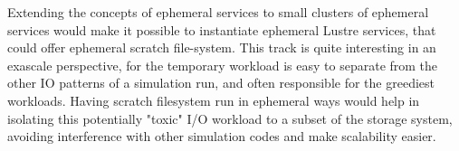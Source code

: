 Extending the concepts of ephemeral services to small clusters of ephemeral services would make it possible to 
instantiate ephemeral Lustre services, that could offer ephemeral scratch file-system. This track is quite
interesting in an exascale perspective, for the temporary workload is easy to separate from the other IO patterns
of a simulation run, and often responsible for the greediest workloads. Having scratch filesystem run in 
ephemeral ways would help in isolating this potentially "toxic" I/O workload to a subset of the storage system,
avoiding interference with other simulation codes and make scalability easier. 